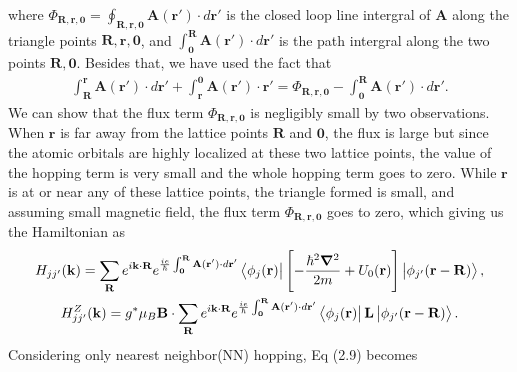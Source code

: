 \documentclass{report}
\newcommand{\f}[2]{\dfrac{#1}{#2}}
\begin{document}
where $\Phi_{\mathbf{R,r,0}} = \oint_{\mathbf{R,r,0}} \mathbf{A(\mathbf{r'})} \cdot d\mathbf{r'} $ is the closed loop line intergral of $\mathbf{A}$ along the triangle points $\mathbf{R,r,0}$, and $\int_{\mathbf{0}}^{\mathbf{R}} \mathbf{A(\mathbf{r'})} \cdot d \mathbf{r'}$ is the path intergral along the two points $\mathbf{R,0}$. Besides that, we have used the fact that
\begin{align}
	\int_{\mathbf{R}}^{\mathbf{r}} \mathbf{A(\mathbf{r'})} \cdot d\mathbf{r'} + \int_{\mathbf{r}}^{\mathbf{0}} \mathbf{A(r')} \cdot \mathbf{r'} = \Phi_{\mathbf{R,r,0}} - \int_{\mathbf{0}}^{\mathbf{R}} \mathbf{A(\mathbf{r'})} \cdot d \mathbf{r'}.
\end{align}
We can show that the flux term $\Phi_{\mathbf{R,r,0}}$ is negligibly small \cite{yalcin_2019} by two observations. When $\mathbf{r}$ is far away from the lattice points $\mathbf{R}$ and $\mathbf{0}$, the flux is large but since the atomic orbitals are highly localized at these two lattice points, the value of the hopping term is very small and the whole hopping term goes to zero. While $\mathbf{r}$ is at or near any of these lattice points, the triangle formed is small, and assuming small magnetic field, the flux term $\Phi_{\mathbf{R,r,0}}$ goes to zero, which giving us the Hamiltonian as
\begin{gather}
	H_{jj'}(\mathbf{k})
	= \sum_{\mathbf{R}} e^{i \mathbf{k \cdot R}} e^{\frac{ie}{\hbar} \int_{\mathbf{0}}^{\mathbf{R}} \mathbf{A(\mathbf{r'})} \cdot d \mathbf{r'} } \bra{\phi_{j}(\mathbf{r})} \left[ -\f{\hbar^{2} \boldsymbol{\nabla}^{2}}{2m} + U_{0} (\mathbf{r}) \right] \ket{\phi_{j'}(\mathbf{r - R})},\\
	H_{jj'}^{Z}(\mathbf{k})
	= g^{*} \mu_{B} \mathbf{B} \cdot \sum_{\mathbf{R}} e^{i\mathbf{k\cdot R}} e^{\frac{ie}{\hbar} \int_{\mathbf{0}}^{\mathbf{R}} \mathbf{A(\mathbf{r'})} \cdot d\mathbf{r'} } \bra{\phi_{j}(\mathbf{r})} \mathbf{L} \ket{\phi_{j'}(\mathbf{r - R})}.
\end{gather}
Considering only nearest neighbor(NN) hopping, Eq (2.9) becomes
\end{document}
